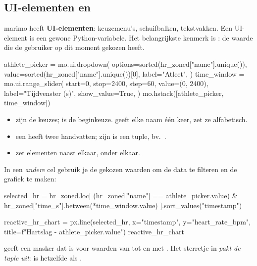 \documentclass[11pt,a4paper]{article}
\begin{document}
\subsection{UI-elementen en }

marimo heeft \textbf{UI-elementen}: keuzemenu's, schuifbalken,
tekstvakken. Een UI-element is een gewone Python-variabele. Het
belangrijkste kenmerk is : de waarde die de gebruiker op
dit moment gekozen heeft.

\begin{python}[noeval]
athlete_picker = mo.ui.dropdown(
    options=sorted(hr_zoned["name"].unique()),
    value=sorted(hr_zoned["name"].unique())[0],
    label="Atleet",
)
time_window = mo.ui.range_slider(
    start=0, stop=2400, step=60, value=(0, 2400),
    label="Tijdvenster (s)", show_value=True,
)
mo.hstack([athlete_picker, time_window])
\end{python}

\begin{itemize}
  \item {} zijn de keuzes;  is de beginkeuze.
         geeft elke naam één keer,  zet ze
        alfabetisch.
  \item een  heeft twee handvatten; zijn
         is een tuple, bv.\ .
  \item {} zet elementen naast elkaar,
         onder elkaar.
\end{itemize}

In een \emph{andere} cel gebruik je de gekozen waarden om de data te
filteren en de grafiek te maken:

\begin{python}[noeval]
selected_hr = hr_zoned.loc[
    (hr_zoned["name"] == athlete_picker.value)
    & hr_zoned["time_s"].between(*time_window.value)
].sort_values("timestamp")

reactive_hr_chart = px.line(selected_hr, x="timestamp", y="heart_rate_bpm",
                            title=f"Hartslag - {athlete_picker.value}")
reactive_hr_chart
\end{python}

 geeft een masker dat  is voor waarden
van  tot en met . Het sterretje in
 \emph{pakt de tuple uit}:
 is hetzelfde als .
\end{document}
